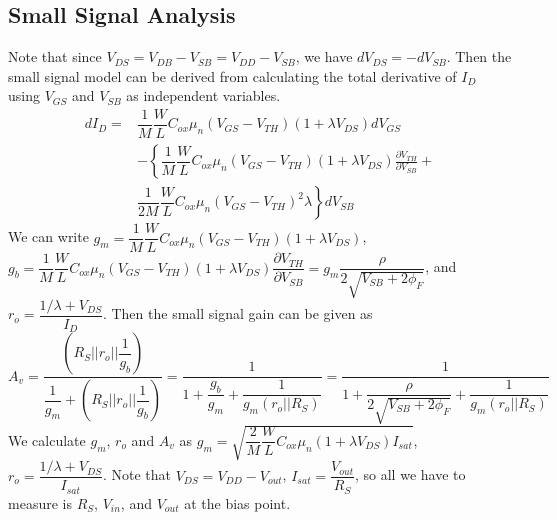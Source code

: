 \documentclass[a4paper, itemph]{oblivoir}
\theoremstyle{definition}
\begin{document}
\subsection{Small Signal Analysis}
Note that since $V_{DS}=V_{DB}-V_{SB}=V_{DD}-V_{SB}$, we have $dV_{DS}=-dV_{SB}$. Then the small signal model can be derived from calculating the total derivative of $I_D$ using $V_{GS}$ and $V_{SB}$ as independent variables.
\begin{align*}
    dI_D=&\dfrac{1}{M}\dfrac{W}{L}C_{ox}\mu_n(V_{GS}-V_{TH})(1+\lambda V_{DS})dV_{GS}\\
    &-\left\{\dfrac{1}{M}\dfrac{W}{L}C_{ox}\mu_n(V_{GS}-V_{TH})(1+\lambda V_{DS})\frac{\partial V_{TH}}{\partial V_{SB}}+\right.\\
    &\left.\dfrac{1}{2M}\dfrac{W}{L}C_{ox}\mu_n(V_{GS}-V_{TH})^2\lambda \right\} dV_{SB}
\end{align*}
We can write $g_m=\dfrac{1}{M}\dfrac{W}{L}C_{ox}\mu_n(V_{GS}-V_{TH})(1+\lambda V_{DS})$, $g_b=\dfrac{1}{M}\dfrac{W}{L}C_{ox}\mu_n(V_{GS}-V_{TH})(1+\lambda V_{DS})\dfrac{\partial V_{TH}}{\partial V_{SB}}=g_m\dfrac{\rho}{2\sqrt{V_{SB}+2\phi_F}}$, and $r_o=\dfrac{1/\lambda+V_{DS}}{I_D}$. Then the small signal gain can be given as
\begin{equation}
    A_v=\frac{\left(R_S||r_o||\dfrac{1}{g_b}\right)}{\dfrac{1}{g_m}+\left(R_S||r_o||\dfrac{1}{g_b}\right)}=\frac{1}{1+\dfrac{g_b}{g_m}+\dfrac{1}{g_m(r_o||R_S)}}=\frac{1}{1+\dfrac{\rho}{2\sqrt{V_{SB}+2\phi_F}}+\dfrac{1}{g_m(r_o||R_S)}}
\end{equation}
We calculate $g_m$, $r_o$ and $A_v$ as $g_m=\sqrt{\dfrac{2}{M}\dfrac{W}{L}C_{ox}\mu_n(1+\lambda V_{DS})I_{sat}}$, $r_o=\dfrac{1/\lambda+V_{DS}}{I_{sat}}$. Note that $V_{DS}=V_{DD}-V_{out}$, $I_{sat}=\dfrac{V_{out}}{R_S}$, so all we have to measure is $R_S$, $V_{in}$, and $V_{out}$ at the bias point.
\end{document}
